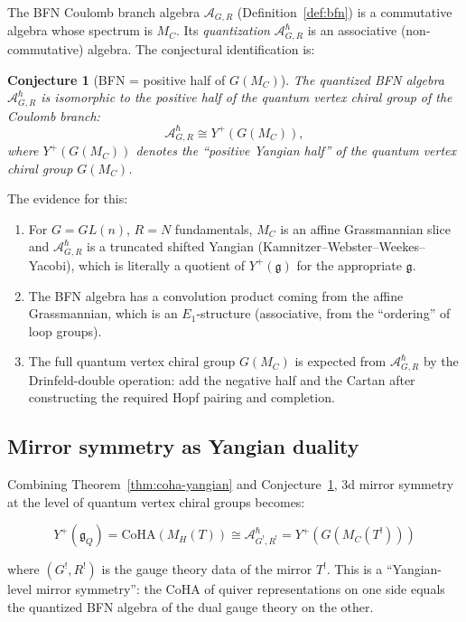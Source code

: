 \documentclass[11pt]{article}
\newtheorem{conjecture}[theorem]{Conjecture}
\theoremstyle{definition}
\theoremstyle{remark}
\newcommand{\Eone}{E_1}
\newcommand{\frakg}{\mathfrak{g}}
\renewcommand{\hbar}{\hslash}
\newcommand{\CoHA}{\mathrm{CoHA}}
\begin{document}
The BFN Coulomb branch algebra $\mathcal{A}_{G,R}$ (Definition~\ref{def:bfn}) is a commutative algebra whose spectrum is $M_C$. Its \emph{quantization} $\mathcal{A}_{G,R}^\hbar$ is an associative (non-commutative) algebra. The conjectural identification is:

\begin{conjecture}[BFN = positive half of $G(M_C)$]
\label{conj:bfn-positive}
The quantized BFN algebra $\mathcal{A}_{G,R}^\hbar$ is isomorphic to the positive half of the quantum vertex chiral group of the Coulomb branch:
\[
 \mathcal{A}_{G,R}^\hbar \cong Y^+(G(M_C)),
\]
where $Y^+(G(M_C))$ denotes the ``positive Yangian half'' of the quantum vertex chiral group $G(M_C)$.
\end{conjecture}

The evidence for this:
\begin{enumerate}[label=(\roman*)]
 \item For $G = GL(n)$, $R = N$ fundamentals, $M_C$ is an affine Grassmannian slice and $\mathcal{A}_{G,R}^\hbar$ is a truncated shifted Yangian (Kamnitzer--Webster--Weekes--Yacobi), which is literally a quotient of $Y^+(\frakg)$ for the appropriate $\frakg$.
 \item The BFN algebra has a convolution product coming from the affine Grassmannian, which is an $\Eone$-structure (associative, from the ``ordering'' of loop groups).
 \item The full quantum vertex chiral group $G(M_C)$ is expected from $\mathcal{A}_{G,R}^\hbar$ by the Drinfeld-double operation: add the negative half and the Cartan after constructing the required Hopf pairing and completion.
\end{enumerate}

\subsection{Mirror symmetry as Yangian duality}

Combining Theorem~\ref{thm:coha-yangian} and Conjecture~\ref{conj:bfn-positive}, 3d mirror symmetry at the level of quantum vertex chiral groups becomes:

\begin{equation}
\label{eq:yangian-duality}
 Y^+(\frakg_Q) = \CoHA(M_H(T)) \cong \mathcal{A}_{G^!,R^!}^\hbar = Y^+(G(M_C(T^!)))
\end{equation}

where $(G^!, R^!)$ is the gauge theory data of the mirror $T^!$. This is a ``Yangian-level mirror symmetry'': the CoHA of quiver representations on one side equals the quantized BFN algebra of the dual gauge theory on the other.
\end{document}
